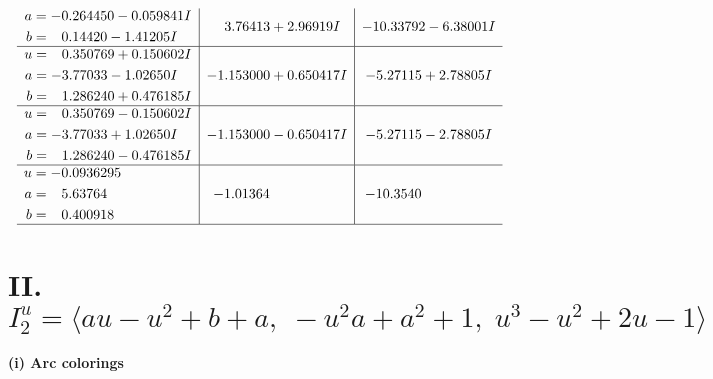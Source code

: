 \documentclass[1p]{elsarticle_modified}
\theoremstyle{definition}
\begin{document}
$$\begin{array}{c|c|c}
\begin{aligned}
a &= -0.264450 - 0.059841 I \\
b &= \phantom{-}0.14420 - 1.41205 I\end{aligned}
 & \phantom{-}3.76413 + 2.96919 I & -10.33792 - 6.38001 I \\ \hline\begin{aligned}
u &= \phantom{-}0.350769 + 0.150602 I \\
a &= -3.77033 - 1.02650 I \\
b &= \phantom{-}1.286240 + 0.476185 I\end{aligned}
 & -1.153000 + 0.650417 I & -5.27115 + 2.78805 I \\ \hline\begin{aligned}
u &= \phantom{-}0.350769 - 0.150602 I \\
a &= -3.77033 + 1.02650 I \\
b &= \phantom{-}1.286240 - 0.476185 I\end{aligned}
 & -1.153000 - 0.650417 I & -5.27115 - 2.78805 I \\ \hline\begin{aligned}
u &= -0.0936295\phantom{ +0.000000I} \\
a &= \phantom{-}5.63764\phantom{ +0.000000I} \\
b &= \phantom{-}0.400918\phantom{ +0.000000I}\end{aligned}
 & -1.01364\phantom{ +0.000000I} & -10.3540\phantom{ +0.000000I}\\
 \hline 
 \end{array}$$\newpage\newpage\renewcommand{\arraystretch}{1}
\centering \section*{II. $I^u_{2}= \langle a u- u^2+b+a,\;- u^2 a+a^2+1,\;u^3- u^2+2 u-1 \rangle$}
\flushleft \textbf{(i) Arc colorings}\\
\end{document}
